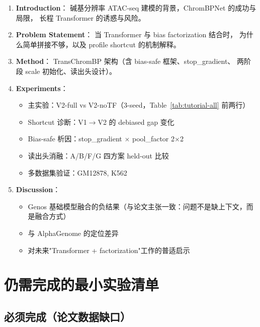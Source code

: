\documentclass[11pt,a4paper]{ctexart}
\begin{document}
\begin{enumerate}[leftmargin=2em]
  \item \textbf{Introduction}：
    碱基分辨率 ATAC-seq 建模的背景，ChromBPNet 的成功与局限，
    长程 Transformer 的诱惑与风险。

  \item \textbf{Problem Statement}：
    当 Transformer 与 bias factorization 结合时，
    为什么简单拼接不够，以及 profile shortcut 的机制解释。

  \item \textbf{Method}：
    TransChromBP 架构（含 bias-safe 框架、stop\_gradient、
    两阶段 scale 初始化、读出头设计）。

  \item \textbf{Experiments}：
    \begin{itemize}[leftmargin=1em]
      \item 主实验：V2-full vs V2-noTF（3-seed，Table~\ref{tab:tutorial-all} 前两行）
      \item Shortcut 诊断：V1$\to$V2 的 debiased gap 变化
      \item Bias-safe 析因：stop\_gradient $\times$ pool\_factor 2$\times$2
      \item 读出头消融：A/B/F/G 四方案 held-out 比较
      \item 多数据集验证：GM12878, K562
    \end{itemize}

  \item \textbf{Discussion}：
    \begin{itemize}[leftmargin=1em]
      \item Genos 基础模型融合的负结果（与论文主张一致：问题不是缺上下文，而是融合方式）
      \item 与 AlphaGenome 的定位差异
      \item 对未来"Transformer + factorization"工作的普适启示
    \end{itemize}
\end{enumerate}

\section{仍需完成的最小实验清单}
\label{sec:todo}

\subsection{必须完成（论文数据缺口）}
\end{document}
